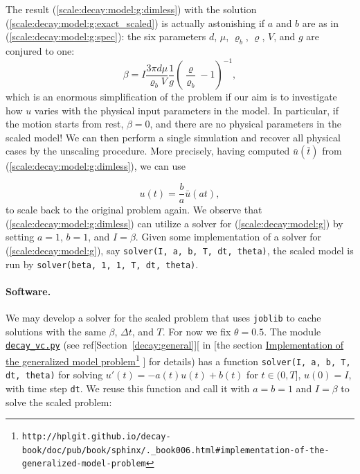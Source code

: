 \documentclass[graybox,envcountchap,sectrefs,final]{svmonodo}
\begin{document}
The result (\ref{scale:decay:model:g:dimless}) with the
solution (\ref{scale:decay:model:g:exact_scaled}) is actually
astonishing if $a$ and $b$ are as in (\ref{scale:decay:model:g:spec}):
the six parameters $d$, $\mu$, $\varrho_b$, $\varrho$, $V$, and $g$
are conjured to one:
\[ \beta = I\frac{3\pi d\mu}{\varrho_b V}
\frac{1}{g}\left(\frac{\varrho}{\varrho_b} -1\right)^{-1},
\]
which is an enormous simplification of the problem if our aim is to
investigate how $u$ varies with the physical input parameters in
the model.
In particular, if the motion starts from rest, $\beta=0$, and
there are no physical parameters in the scaled model!
We can then perform a single simulation and recover all physical
cases by the unscaling procedure. More precisely,
having computed $\bar u(\bar t)$ from (\ref{scale:decay:model:g:dimless}),
we can use

\begin{equation}
u(t) = \frac{b}{a}\bar u(at),
\end{equation}
to scale back to the original
problem again.
We observe that (\ref{scale:decay:model:g:dimless}) can utilize a solver
for (\ref{scale:decay:model:g}) by setting $a=1$, $b=1$, and $I=\beta$.
Given some implementation of a solver for (\ref{scale:decay:model:g}),
say \texttt{solver(I, a, b, T, dt, theta)},
the scaled model is run by \texttt{solver(beta, 1, 1, T, dt, theta)}.



\paragraph{Software.}
We may develop a solver for the scaled problem that uses \texttt{joblib}
to cache solutions with the same $\beta$, $\Delta t$, and $T$.
For now we fix $\theta=0.5$.
The module \href{{http://tinyurl.com/o8pb3yy/decay_vc.py}}{\nolinkurl{decay_vc.py}}
(see ref[Section~\ref{decay:general}][ in \cite{Langtangen_decay}[the
section \href{{http://hplgit.github.io/decay-book/doc/pub/book/sphinx/._book006.html#implementation-of-the-generalized-model-problem}}{Implementation of the generalized model problem}\footnote{\texttt{http://hplgit.github.io/decay-book/doc/pub/book/sphinx/.\_book006.html\#implementation-of-the-generalized-model-problem}}
\cite{Langtangen_decay}] for details)
has a function
\texttt{solver(I, a, b, T, dt, theta)} for solving $u'(t)=-a(t)u(t)+b(t)$ for
$t\in (0,T]$, $u(0)=I$, with time step \texttt{dt}.
We reuse this function and call it with $a=b=1$ and $I=\beta$ to solve
the scaled problem:
\end{document}
